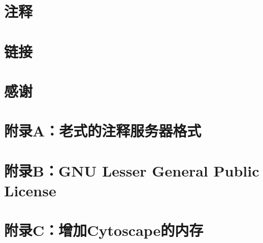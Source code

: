 \documentclass[a4paper, oneside]{book}
\begin{document}
\begin{CJK}{UTF8}{gbsn}
\chapter{注释}


\chapter{链接}


\chapter*{感谢}


\chapter*{附录A：老式的注释服务器格式}


\chapter*{附录B：GNU Lesser General Public License}


\chapter*{附录C：增加Cytoscape的内存}


\end{CJK}
\end{document}
